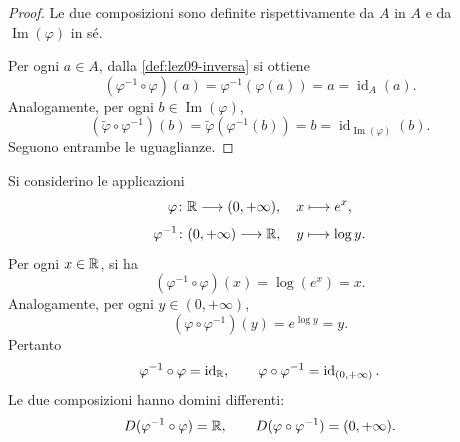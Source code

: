 \begin{proof}
Le due composizioni sono definite rispettivamente
da \(A\) in \(A\) e da \(\operatorname{Im}(\varphi)\)
in sé.

Per ogni \(a\in A\), dalla \cref{def:lez09-inversa}
si ottiene
\[
  (\varphi^{-1}\circ\varphi)(a)
  =\varphi^{-1}(\varphi(a))=a
  =\operatorname{id}_A(a).
\]
Analogamente, per ogni \(b\in\operatorname{Im}(\varphi)\),
\[
  (\widetilde{\varphi}\circ\varphi^{-1})(b)
  =\widetilde{\varphi}(\varphi^{-1}(b))=b
  =\operatorname{id}_{\operatorname{Im}(\varphi)}(b).
\]
Seguono entrambe le uguaglianze.
\end{proof}

\begin{example}
\label{ex:lez09-inversa-esponenziale}
Si considerino le applicazioni
\[
  \varphi\colon\mathbb{R}\longrightarrow(0,+\infty),
  \quad x\longmapsto e^x,
\]
\[
  \varphi^{-1}\colon(0,+\infty)\longrightarrow\mathbb{R},
  \quad y\longmapsto\log y.
\]
Per ogni \(x\in\mathbb{R}\), si ha
\[
  (\varphi^{-1}\circ\varphi)(x)
  =\log(e^x)=x.
\]
Analogamente, per ogni \(y\in(0,+\infty)\),
\[
  (\varphi\circ\varphi^{-1})(y)
  =e^{\log y}=y.
\]
Pertanto
\[
  \varphi^{-1}\circ\varphi=\operatorname{id}_{\mathbb{R}},
  \qquad
  \varphi\circ\varphi^{-1}
  =\operatorname{id}_{(0,+\infty)}.
\]
Le due composizioni hanno domini differenti:
\[
  D(\varphi^{-1}\circ\varphi)=\mathbb{R},
  \qquad
  D(\varphi\circ\varphi^{-1})=(0,+\infty).
\]
\end{example}
